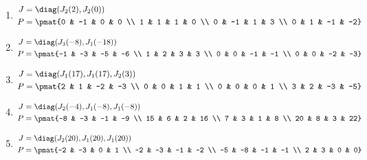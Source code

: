 \begin{enumerate}
\item

\begin{align*}
J &= \diag(J_{2}(2), J_{2}(0))\\
P &= \pmat{0 & -1 & 0 & 0 \\ 1 & 1 & 1 & 0 \\ 0 & -1 & 1 & 3 \\ 0 & 1 & -1 & -2}
\end{align*}

\item

\begin{align*}
J &= \diag(J_{3}(-8), J_{1}(-18))\\
P &= \pmat{-1 & -3 & -5 & -6 \\ 1 & 2 & 3 & 3 \\ 0 & 0 & -1 & -1 \\ 0 & 0 & -2 & -3}
\end{align*}

\item

\begin{align*}
J &= \diag(J_{1}(17), J_{1}(17), J_{2}(3))\\
P &= \pmat{2 & 1 & -2 & -3 \\ 0 & 0 & 1 & 1 \\ 0 & 0 & 0 & 1 \\ 3 & 2 & -3 & -5}
\end{align*}

\item

\begin{align*}
J &= \diag(J_{2}(-4), J_{1}(-8), J_{1}(-8))\\
P &= \pmat{-8 & -3 & -1 & -9 \\ 15 & 6 & 2 & 16 \\ 7 & 3 & 1 & 8 \\ 20 & 8 & 3 & 22}
\end{align*}

\item

\begin{align*}
J &= \diag(J_{2}(20), J_{1}(20), J_{1}(20))\\
P &= \pmat{-2 & -3 & 0 & 1 \\ -2 & -3 & -1 & -2 \\ -5 & -8 & -1 & -1 \\ 2 & 3 & 0 & 0}
\end{align*}


\end{enumerate}
